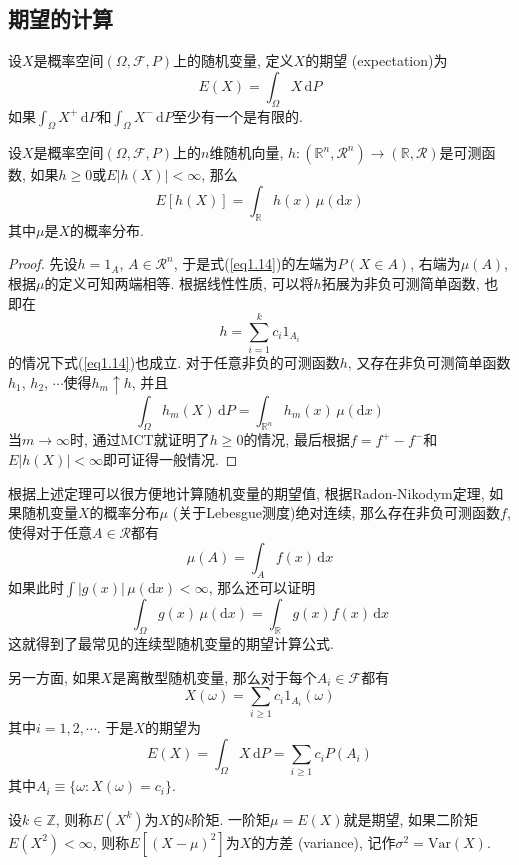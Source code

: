 \documentclass[cn, 12pt, math=mtpro2, bibstyle=apa, blue, twocol]{elegantbook}
\newcommand{\F}{\mathcal{F}}
\newcommand{\R}{\mathbb{R}}
\begin{document}
\subsection{期望的计算}
\begin{definition}
设$X$是概率空间$(\Omega,\F,P)$上的随机变量, 定义$X$的期望 (expectation)为
$$E(X)=\int_{\Omega}X\,\text{d}P$$
如果$\int_\Omega X^+\,\text{d}P$和$\int_\Omega X^-\,\text{d}P$至少有一个是有限的.
\end{definition}
\begin{theorem}
  设$X$是概率空间$(\Omega,\F,P)$上的$n$维随机向量, $h:(\R^n,\mathcal{R}^n)\to(\R,\mathcal{R})$是可测函数, 如果$h\geq 0$或$E|h(X)|<\infty$, 那么
\begin{equation}\label{eq1.14}
  E[h(X)]=\int_{\R}h(x)\,\mu(\text{d}x)
\end{equation}
其中$\mu$是$X$的概率分布.
\end{theorem}
\begin{proof}
  先设$h=1_A$, $A\in\mathcal{R}^n$, 于是式(\ref{eq1.14})的左端为$P(X\in A)$, 右端为$\mu(A)$, 根据$\mu$的定义可知两端相等. 根据线性性质, 可以将$h$拓展为非负可测简单函数, 也即在
  $$h=\sum_{i=1}^{k}c_i1_{A_i}$$
  的情况下式(\ref{eq1.14})也成立. 对于任意非负的可测函数$h$, 又存在非负可测简单函数$h_1$, $h_2$, $\cdots$使得$h_m\uparrow h$, 并且
  $$\int_\Omega h_m(X)\,\text{d}P=\int_{\R^n} h_m(x)\,\mu(\text{d}x)$$
  当$m\to\infty$时, 通过MCT就证明了$h\geq0$的情况, 最后根据$f=f^+-f^-$和$E|h(X)|<\infty$即可证得一般情况.

\end{proof}
根据上述定理可以很方便地计算随机变量的期望值, 根据Radon-Nikodym定理, 如果随机变量$X$的概率分布$\mu$ (关于Lebesgue测度)绝对连续, 那么存在非负可测函数$f$, 使得对于任意$A\in\mathcal{R}$都有
$$\mu(A)=\int_Af(x)\,\text{d}x$$
如果此时$\int|g(x)|\,\mu(\text{d}x)<\infty$, 那么还可以证明
\begin{equation}\label{eq1.23}
  \int_\Omega g(x)\,\mu(\text{d}x)=\int_{\R}g(x)f(x)\,\text{d}x
\end{equation}
这就得到了最常见的连续型随机变量的期望计算公式.

另一方面, 如果$X$是离散型随机变量, 那么对于每个$A_i\in\F$都有
$$X(\omega)=\sum_{i\geq 1} c_i1_{A_i}(\omega)$$
其中$i=1,2,\cdots$. 于是$X$的期望为
$$E(X)=\int_\Omega X\,\text{d}P=\sum_{i\ge1}c_iP(A_i)$$
其中$A_i\equiv \{\omega: X(\omega)=c_i\}$.

\begin{definition}
设$k\in\mathbb{Z}$, 则称$E(X^k)$为$X$的$k$阶矩. 一阶矩$\mu=E(X)$就是期望, 如果二阶矩$E(X^2)<\infty$, 则称$E[(X-\mu)^2]$为$X$的方差 (variance), 记作$\sigma^2=\text{Var}(X)$.

\end{definition}
\end{document}
